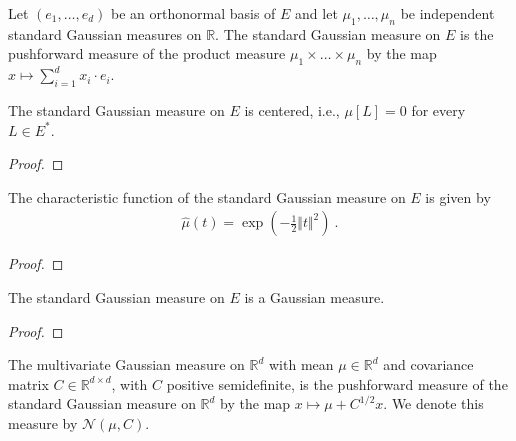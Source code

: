 \begin{definition}\label{def:stdGaussian}
Let $(e_1, \ldots, e_d)$ be an orthonormal basis of $E$ and let $\mu_1, \ldots, \mu_n$ be independent standard Gaussian measures on $\mathbb{R}$.
The standard Gaussian measure on $E$ is the pushforward measure of the product measure $\mu_1 \times \ldots \times \mu_n$ by the map $x \mapsto \sum_{i=1}^d x_i \cdot e_i$.
\end{definition}


\begin{lemma}\label{lem:isCentered_stdGaussian}
The standard Gaussian measure on $E$ is centered, i.e., $\mu[L] = 0$ for every $L \in E^*$.
\end{lemma}

\begin{proof}

\end{proof}


\begin{lemma}\label{lem:charFun_stdGaussian}
The characteristic function of the standard Gaussian measure on $E$ is given by
\begin{align*}
  \hat{\mu}(t) = \exp\left(-\frac{1}{2} \Vert t \Vert^2 \right) \: .
\end{align*}
\end{lemma}

\begin{proof}

\end{proof}


\begin{lemma}\label{lem:isGaussian_stdGaussian}
The standard Gaussian measure on $E$ is a Gaussian measure.
\end{lemma}

\begin{proof}

\end{proof}


\begin{definition}\label{def:multivariateGaussian}
The multivariate Gaussian measure on $\mathbb{R}^d$ with mean $\mu \in \mathbb{R}^d$ and covariance matrix $C \in \mathbb{R}^{d \times d}$, with $C$ positive semidefinite, is the pushforward measure of the standard Gaussian measure on $\mathbb{R}^d$ by the map $x \mapsto \mu + C^{1/2} x$.
We denote this measure by $\mathcal{N}(\mu, C)$.
\end{definition}



